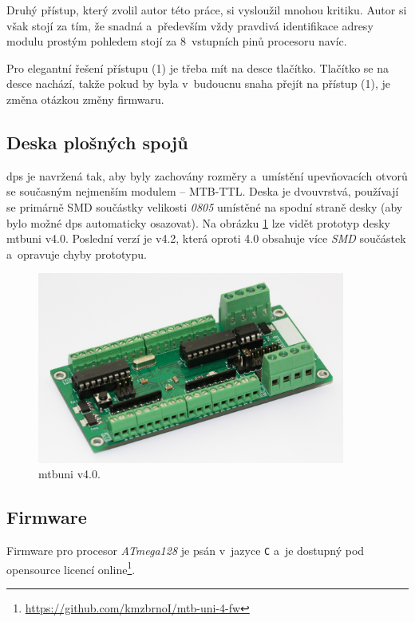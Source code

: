 Druhý přístup, který zvolil autor této práce, si vysloužil mnohou kritiku.
Autor si však stojí za tím, že snadná a~především vždy pravdivá identifikace
adresy modulu prostým pohledem stojí za 8~vstupních pinů procesoru navíc.

Pro elegantní řešení přístupu (1) je třeba mít na desce tlačítko. Tlačítko se
na desce nachází, takže pokud by byla v~budoucnu snaha přejít na přístup (1),
je změna otázkou změny firmwaru.

\subsection{Deska plošných spojů}

\gls{dps} je navržená tak, aby byly zachovány rozměry a~umístění
upevňovacích otvorů se současným nejmenším modulem – MTB-TTL. Deska je
dvouvrstvá, používají se primárně SMD součástky velikosti \textit{0805} umístěné
na spodní straně desky (aby bylo možné \gls{dps} automaticky osazovat). Na
obrázku \ref{fig:mtb-uni-v4} lze vidět prototyp desky \gls{mtbuni} v4.0.
Poslední verzí je v4.2, která oproti 4.0 obsahuje více \textit{SMD}
součástek a~opravuje chyby prototypu.

\begin{figure}[ht]
\includegraphics[width=0.9\textwidth]{data/uni-v40-screw-all.jpg}
\caption{\gls{mtbuni} v4.0.}
\label{fig:mtb-uni-v4}
\end{figure}

\subsection{Firmware}

Firmware pro procesor \textit{ATmega128} je psán v~jazyce \texttt{C} a~je
dostupný pod opensource licencí
online\footnote{\url{https://github.com/kmzbrnoI/mtb-uni-4-fw}}.

